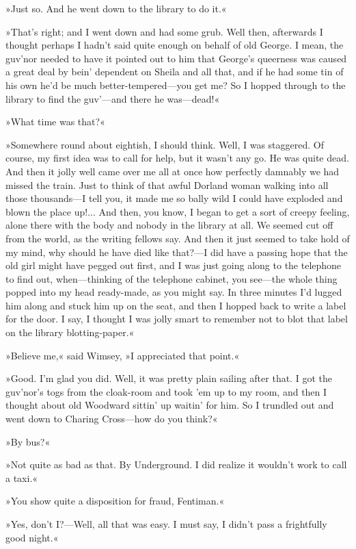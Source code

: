 »Just so. And he went down to the library to do it.«

»That's right; and I went down and had some grub. Well then, afterwards I thought perhaps I hadn't said quite enough on behalf of old George. I mean, the guv'nor needed to have it pointed out to him that George's queerness was caused a great deal by bein' dependent on Sheila and all that, and if he had some tin of his own he'd be much better-tempered—you get me? So I hopped through to the library to find the guv'—and there he was—dead!«

»What time was that?«

»Somewhere round about eightish, I should think. Well, I was staggered. Of course, my first idea was to call for help, but it wasn't any go. He was quite dead. And then it jolly well came over me all at once how perfectly damnably we had missed the train. Just to think of that awful Dorland woman walking into all those thousands—I tell you, it made me so bally wild I could have exploded and blown the place up!... And then, you know, I began to get a sort of creepy feeling, alone there with the body and nobody in the library at all. We seemed cut off from the world, as the writing fellows say. And then it just seemed to take hold of my mind, why should he have died like that?—I did have a passing hope that the old girl might have pegged out first, and I was just going along to the telephone to find out, when—thinking of the telephone cabinet, you see—the whole thing popped into my head ready-made, as you might say. In three minutes I'd lugged him along and stuck him up on the seat, and then I hopped back to write a label for the door. I say, I thought I was jolly smart to remember not to blot that label on the library blotting-paper.«

»Believe me,« said Wimsey, »I appreciated that point.«

»Good. I'm glad you did. Well, it was pretty plain sailing after that. I got the guv'nor's togs from the cloak-room and took 'em up to my room, and then I thought about old Woodward sittin' up waitin' for him. So I trundled out and went down to Charing Cross—how do you think?«

»By bus?«

»Not quite as bad as that. By Underground. I did realize it wouldn't work to call a taxi.«

»You show quite a disposition for fraud, Fentiman.«

»Yes, don't I?—Well, all that was easy. I must say, I didn't pass a frightfully good night.«

